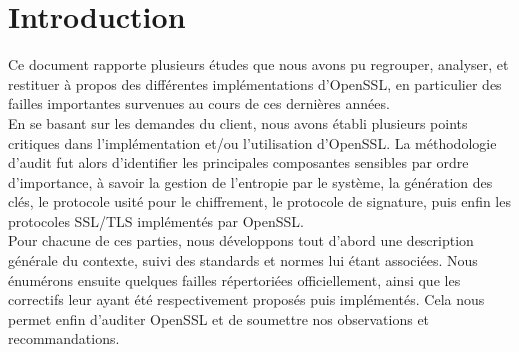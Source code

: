 \section*{Introduction}

Ce document rapporte plusieurs études que nous avons pu regrouper, analyser, et restituer à propos des différentes implémentations d'OpenSSL, en particulier des failles importantes survenues au cours de ces dernières années. \\


En se basant sur les demandes du client, nous avons établi plusieurs points critiques dans l'implémentation et/ou l'utilisation d'OpenSSL. La méthodologie d'audit fut alors d'identifier les principales composantes sensibles par ordre d'importance, à savoir la gestion de l'entropie par le système, la génération des clés, le protocole usité pour le chiffrement, le protocole de signature, puis enfin les protocoles SSL/TLS implémentés par OpenSSL.\\


Pour chacune de ces parties, nous développons tout d'abord une description générale du contexte, suivi  des standards et normes lui étant associées. Nous énumérons ensuite quelques failles répertoriées officiellement, ainsi que les correctifs leur ayant été respectivement proposés puis implémentés. Cela nous permet enfin d'auditer OpenSSL et de soumettre nos observations et recommandations.

